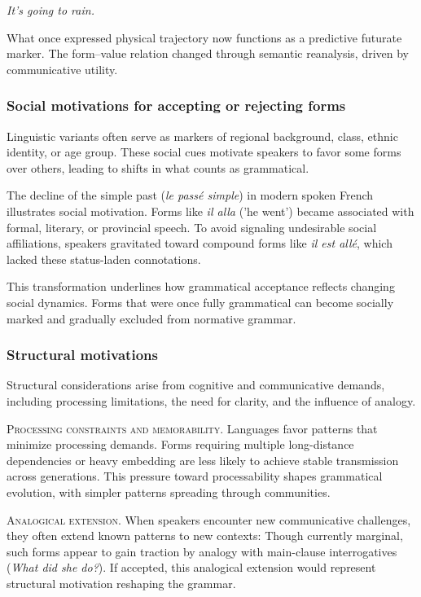 \documentclass[12pt,letterpaper]{article}
\newcommand{\mention}[1]{\textit{#1}}
\newcommand{\olang}[1]{\textit{#1}}
\begin{document}
\ea
\textit{It's going to rain.}
\z

What once expressed physical trajectory now functions as a predictive futurate marker. The form--value relation changed through semantic reanalysis, driven by communicative utility.

\subsubsection{Social motivations for accepting or rejecting forms}\label{subsec:social-motivations}

Linguistic variants often serve as markers of regional background, class, ethnic identity, or age group. These social cues motivate speakers to favor some forms over others, leading to shifts in what counts as grammatical.

The decline of the simple past (\olang{le passé simple}) in modern spoken French illustrates social motivation. Forms like \olang{il alla} ('he went') became associated with formal, literary, or provincial speech. To avoid signaling undesirable social affiliations, speakers gravitated toward compound forms like \olang{il est allé}, which lacked these status-laden connotations.

This transformation underlines how grammatical acceptance reflects changing social dynamics. Forms that were once fully grammatical can become socially marked and gradually excluded from normative grammar.

\subsubsection{Structural motivations}\label{subsec:structural-motivations}

Structural considerations arise from cognitive and communicative demands, including processing limitations, the need for clarity, and the influence of analogy.

\textsc{Processing constraints and memorability.}
Languages favor patterns that minimize processing demands. Forms requiring multiple long-distance dependencies or heavy embedding are less likely to achieve stable transmission across generations. This pressure toward processability shapes grammatical evolution, with simpler patterns spreading through communities.

\textsc{Analogical extension.}
When speakers encounter new communicative challenges, they often extend known patterns to new contexts:
\ea[\textsuperscript{?}]{\mention{I asked about what did she do.}}
\z
Though currently marginal, such forms appear to gain traction by analogy with main-clause interrogatives (\mention{What did she do?}). If accepted, this analogical extension would represent structural motivation reshaping the grammar.
\end{document}
